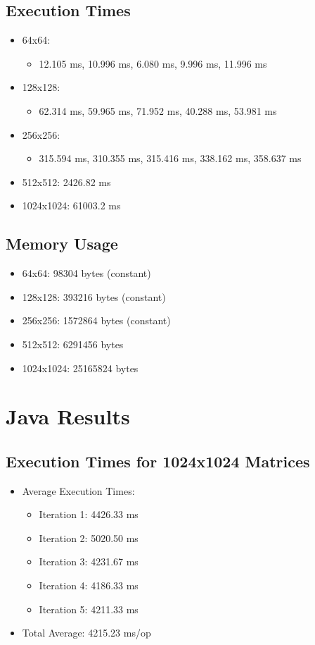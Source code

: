 \documentclass{article}
\begin{document}
\subsection{Execution Times}
\begin{itemize}
    \item 64x64:
        \begin{itemize}
            \item 12.105 ms, 10.996 ms, 6.080 ms, 9.996 ms, 11.996 ms
        \end{itemize}
    \item 128x128:
        \begin{itemize}
            \item 62.314 ms, 59.965 ms, 71.952 ms, 40.288 ms, 53.981 ms
        \end{itemize}
    \item 256x256:
        \begin{itemize}
            \item 315.594 ms, 310.355 ms, 315.416 ms, 338.162 ms, 358.637 ms
        \end{itemize}
    \item 512x512: 2426.82 ms
    \item 1024x1024: 61003.2 ms
\end{itemize}

\subsection{Memory Usage}
\begin{itemize}
    \item 64x64: 98304 bytes (constant)
    \item 128x128: 393216 bytes (constant)
    \item 256x256: 1572864 bytes (constant)
    \item 512x512: 6291456 bytes
    \item 1024x1024: 25165824 bytes
\end{itemize}

\section{Java Results}

\subsection{Execution Times for 1024x1024 Matrices}
\begin{itemize}
    \item Average Execution Times:
        \begin{itemize}
            \item Iteration 1: 4426.33 ms
            \item Iteration 2: 5020.50 ms
            \item Iteration 3: 4231.67 ms
            \item Iteration 4: 4186.33 ms
            \item Iteration 5: 4211.33 ms
        \end{itemize}
    \item Total Average: 4215.23 ms/op
\end{itemize}
\end{document}
